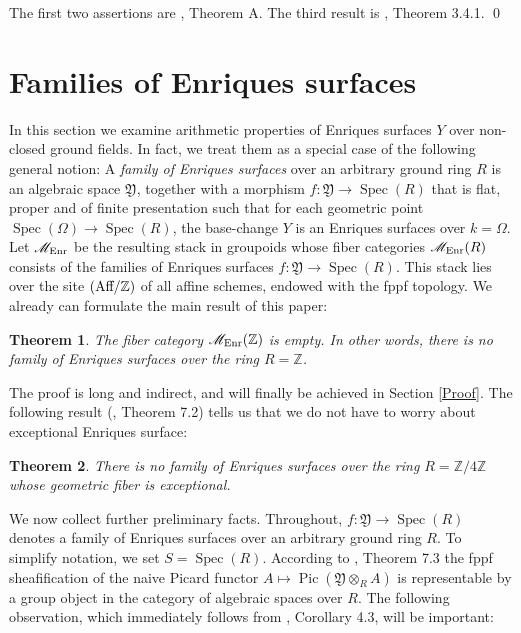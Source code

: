 \documentclass[oneside, 12pt]{amsart}
\newcommand\mylabel[1]{\label{#1}\marginpar{\vspace{-1ex}\medskip\medskip\footnotesize \tt #1}}
\renewcommand\mylabel[1]{\label{#1}}
\newtheorem{theorem}{Theorem}[section]
\theoremstyle{definition}
\theoremstyle{remark}
\newcommand{\ZZ}{\mathbb{Z}}
\newcommand{\shM}{\mathscr{M}}
\newcommand{\foY}{\mathfrak{Y}}
\newcommand{\Aff}{\text{\rm Aff}}
\newcommand{\Pic}{\operatorname{Pic}}
\newcommand{\ra}{\rightarrow}
\newcommand{\Spec}{\operatorname{Spec}}
\newcommand{\Enr}{{\text{\rm Enr}}}
\begin{document}
\proof
The first two assertions  are \cite{Ekedahl; Shepherd-Barron 2004}, Theorem A.
The third result is \cite{Cossec; Dolgachev 1989}, Theorem 3.4.1.
\qed


\section{Families of Enriques surfaces}
\mylabel{Families}

In this section we examine    arithmetic properties of Enriques surfaces $Y$
over non-closed ground fields. In fact, we treat them as a special case of the following general notion:
A \emph{family of Enriques surfaces} over an arbitrary ground ring $R$ is an algebraic space $\foY$,
together with a morphism  $f:\foY\ra\Spec(R)$
that is flat,  proper and of finite presentation such that for each geometric point $\Spec(\Omega)\ra\Spec(R)$,
the base-change $Y$ is an Enriques surfaces over $k=\Omega$.  
Let $\shM_\Enr$ be the resulting stack in groupoids 
whose fiber categories $\shM_\Enr(R)$ consists 
of the families of Enriques surfaces $f:\foY\ra\Spec(R)$.  This stack lies over the site $(\Aff/\ZZ)$ of
all affine schemes, endowed with the fppf topology. 
We already   can formulate the main result of this paper:

\begin{theorem}
\mylabel{no enriques over integers}
The fiber category $\shM_\Enr(\ZZ)$ is empty. In other words, 
there is no family of Enriques surfaces over the ring $R=\ZZ$.
\end{theorem}

The proof is long and indirect, and will  finally be achieved  in Section \ref{Proof}. 
The following result  (\cite{Schroeer 2021b}, Theorem 7.2) tells us that we do not have to worry
about 
exceptional Enriques surface:

\begin{theorem}
\mylabel{no exceptional}
There is no family of Enriques surfaces over the ring $R=\ZZ/4\ZZ$ whose
geometric fiber is exceptional.
\end{theorem}

We now collect further preliminary facts.
Throughout, $f:\foY\ra \Spec(R)$ denotes a family of Enriques surfaces over an arbitrary ground ring $R$.
To simplify notation, we set $S=\Spec(R)$.
According to \cite{Artin 1969}, Theorem 7.3 
the fppf sheafification of the naive Picard functor $A\mapsto\Pic(\foY\otimes_RA)$ is representable by a 
group object in the category of algebraic spaces over $R$.  
The following observation, which immediately follows from \cite{Ekedahl; Hyland; Shepherd-Barron 2012}, Corollary 4.3,
will be important:
\end{document}
